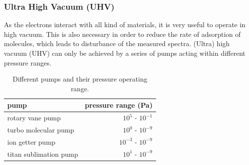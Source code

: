 \documentclass[a4paper]{scrartcl}
\numberwithin{equation}{section}
\numberwithin{figure}{section}
\numberwithin{table}{section}
\begin{document}
\subsubsection{Ultra High Vacuum (UHV)}
As the electrons interact with all kind of materials, it is very useful to operate in high vacuum. This is also necessary in order to reduce the rate of adsorption of molecules, which leads to disturbance of the measured spectra. (Ultra) high  vacuum (UHV) can only be achieved by a series of pumps acting within different pressure ranges.
\begin{table}
\begin{tabular}{lr}
\toprule
pump & pressure range (Pa)\\
\midrule
\small rotary vane pump & $10^5$ - $10^{-1}$  \\ 
\small turbo molecular pump &  $10^0$  - $10^{-9}$  \\
\small ion getter pump  & $ 10^{-3}$  - $10^{-9}$  \\
\small titan sublimation pump & $10^1$  - $10^{-9}$  \\
\bottomrule
\end{tabular}
\caption{Different pumps and their pressure operating range. \cite{gop} }
\label{tab:pump}
\end{table}
\end{document}
